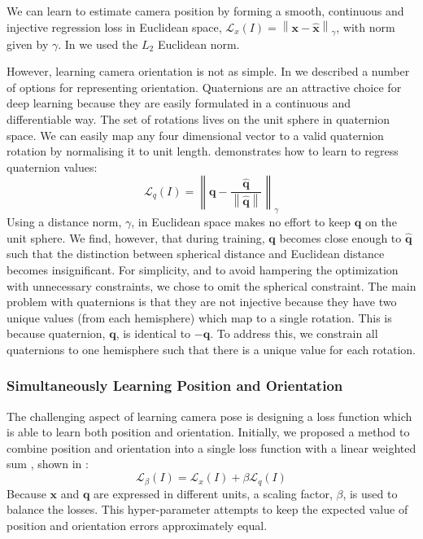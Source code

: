 We can learn to estimate camera position by forming a smooth, continuous and injective regression loss in Euclidean space, $\mathcal{L}_x(I) = \left\lVert\mathbf{x} - \mathbf{\hat{x}}\right\rVert_\gamma$, with norm given by $\gamma$. In \citet{kendall2015posenet} we used the $L_2$ Euclidean norm.

However, learning camera orientation is not as simple. In  we described a number of options for representing orientation. Quaternions are an attractive choice for deep learning because they are easily formulated in a continuous and differentiable way. The set of rotations lives on the unit sphere in quaternion space. We can easily map any four dimensional vector to a valid quaternion rotation by normalising it to unit length. \citet{kendall2015posenet} demonstrates how to learn to regress quaternion values:
\begin{equation}
\mathcal{L}_q(I) = \left\lVert \mathbf{q}-\frac{\mathbf{\hat{q}}}{\left\lVert\mathbf{\hat{q}}\right\rVert}\right\rVert_\gamma
\label{eqn:loss_quaternion_posenet}
\end{equation}
Using a distance norm, $\gamma$, in Euclidean space makes no effort to keep $\mathbf{q}$ on the unit sphere. We find, however, that during training, $\mathbf{q}$ becomes close enough to $\mathbf{\hat{q}}$ such that the distinction between spherical distance and Euclidean distance becomes insignificant. For simplicity, and to avoid hampering the optimization with unnecessary constraints, we chose to omit the spherical constraint. The main problem with quaternions is that they are not injective because they have two unique values (from each hemisphere) which map to a single rotation. This is because quaternion, $\textbf{q}$, is identical to $-\textbf{q}$. To address this, we constrain all quaternions to one hemisphere such that there is a unique value for each rotation.

\subsubsection{Simultaneously Learning Position and Orientation}
\label{sec:loss_weighted}

The challenging aspect of learning camera pose is designing a loss function which is able to learn both position and orientation. Initially, we proposed a method to combine position and orientation into a single loss function with a linear weighted sum \citep{kendall2015posenet}, shown in :
\begin{equation}
\mathcal{L}_{\beta}(I) = \mathcal{L}_x(I) + \beta \mathcal{L}_q(I)
\label{eqn:loss1}
\end{equation}
Because $\mathbf{x}$ and $\mathbf{q}$ are expressed in different units, a scaling factor, $\beta$, is used to balance the losses. This hyper-parameter attempts to keep the expected value of position and orientation errors approximately equal.

